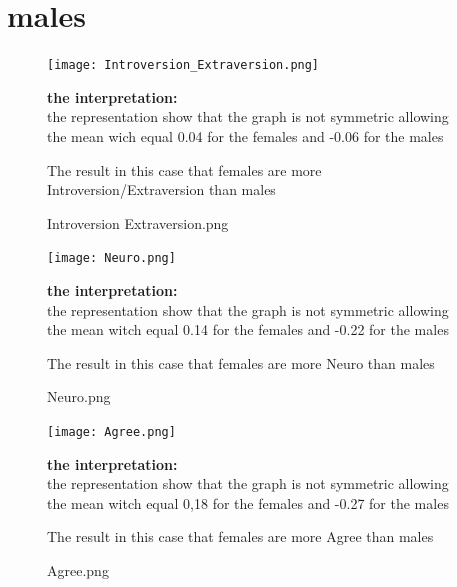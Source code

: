 \chapter{males}













\begin{figure}[]
\setlength{\abovecaptionskip}{-4pt}
\begin{center}
\texttt{[image: Introversion\_Extraversion.png]}
  \caption{Introversion Extraversion.png}
  \end{center}


{\normalsize{\bf the interpretation:}} \\\vspace{0.5cm}
the representation show that the graph is not symmetric allowing 
the mean wich equal 0.04  for the females and -0.06  for the males 

The result in this case that females are more Introversion/Extraversion than males
\end{figure}


\begin{figure}[]
\setlength{\abovecaptionskip}{-4pt}
\begin{center}
\texttt{[image: Neuro.png]}
  \caption{Neuro.png}
  \end{center}

{\normalsize{\bf the interpretation:}} \\\vspace{0.5cm}
the representation show that the graph is not symmetric allowing 
the mean witch equal 0.14 for the females and -0.22 for the males 

The result in this case that females are more Neuro  than males
\end{figure}

\begin{figure}[]
\setlength{\abovecaptionskip}{-4pt}
\begin{center}
\texttt{[image: Agree.png]}
  \caption{Agree.png}
  \end{center}

{\normalsize{\bf the interpretation:}} \\\vspace{0.5cm}
the representation show that the graph is not symmetric allowing 
the mean witch equal 0,18 for the females and -0.27 for the males

The result in this case that females are more Agree  than males
\end{figure}

